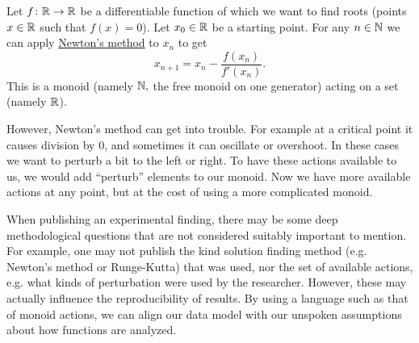 \documentclass[CT4S-EN-RU]{subfiles}
\begin{document}
\begin{applicationENG}
Let $f\colon{\mathbb R}\rightarrow{\mathbb R}$ be a differentiable function of which we want to find roots (points $x\in{\mathbb R}$ such that $f(x)=0$). Let $x_0\in{\mathbb R}$ be a starting point. For any $n\in{\mathbb N}$ we can apply \href{http://en.wikipedia.org/wiki/Newton's_method}{\text Newton's method} to $x_n$ to get $$x_{n+1}=x_n-\frac{f(x_n)}{f'(x_n)}.$$
This is a monoid (namely ${\mathbb N},$ the free monoid on one generator) acting on a set (namely ${\mathbb R}$).

However, Newton's method can get into trouble. For example at a critical point it causes division by 0, and sometimes it can oscillate or overshoot. In these cases we want to perturb a bit to the left or right. To have these actions available to us, we would add “perturb” elements to our monoid. Now we have more available actions at any point, but at the cost of using a more complicated monoid.

When publishing an experimental finding, there may be some deep methodological questions that are not considered suitably important to mention. For example, one may not publish the kind solution finding method (e.g. Newton's method or Runge-Kutta) that was used, nor the set of available actions, e.g. what kinds of perturbation were used by the researcher. However, these may actually influence the reproducibility of results. By using a language such as that of monoid actions, we can align our data model with our unspoken assumptions about how functions are analyzed.
\end{applicationENG}
\end{document}
